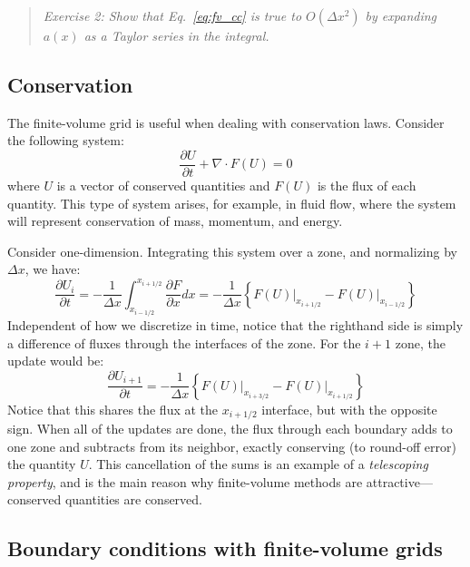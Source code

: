 \begin{quote}
{\em Exercise 2: Show that Eq.~\ref{eq:fv_cc} is true to $O(\Delta x^2)$ by expanding
$a(x)$ as a Taylor series in the integral.}
\end{quote}

\subsection{Conservation}

The finite-volume grid is useful when dealing with conservation laws.
Consider the following system:
\begin{equation}
\frac{\partial U}{\partial t} + \nabla \cdot F(U) = 0
\end{equation}
where $U$ is a vector of conserved quantities and $F(U)$ is the flux
of each quantity.  This type of system arises, for example, in fluid
flow, where the system will represent conservation of mass, momentum,
and energy.

Consider one-dimension.  
Integrating this system over a zone, and normalizing by $\Delta x$, we have:
\begin{equation}
\frac{\partial U_i}{\partial t} = 
  -\frac{1}{\Delta x} \int_{x_{i-1/2}}^{x_{i+1/2}} \frac{\partial F}{\partial x} dx =
  - \frac{1}{\Delta x} \left \{ \left . F(U) \right |_{x_{i+1/2}} -
                                \left . F(U) \right |_{x_{i-1/2}} \right \}
\end{equation}
Independent of how we discretize in time, notice that the righthand side
is simply a difference of fluxes through the interfaces of the zone.
For the $i+1$ zone, the update would be:
\begin{equation}
\frac{\partial U_{i+1}}{\partial t} = 
  - \frac{1}{\Delta x} \left \{ \left . F(U) \right |_{x_{i+3/2}} -
                                \left . F(U) \right |_{x_{i+1/2}} \right \}
\end{equation}
Notice that this shares the flux at the $x_{i+1/2}$ interface, but with the 
opposite sign.  When all of the updates are done, the flux through each
boundary adds to one zone and subtracts from its neighbor, exactly conserving
(to round-off error) the quantity $U$.  This cancellation of the sums
is an example of a {\em telescoping property}, and is the main reason
why finite-volume methods are attractive---conserved quantities are 
conserved.

\subsection{Boundary conditions with finite-volume grids}

